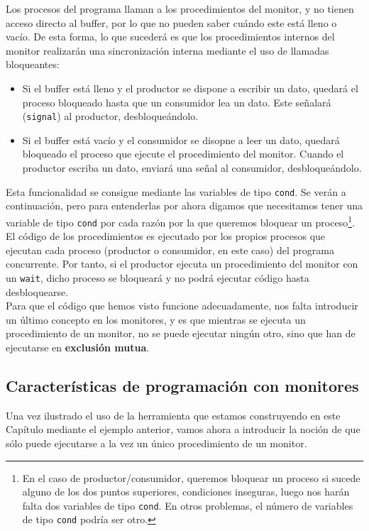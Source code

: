 \begin{ejemplo}
\begin{itemize}
    \end{itemize}
    Los procesos del programa llaman a los procedimientos del monitor, y no tienen acceso directo al buffer, por lo que no pueden saber cuándo este está lleno o vacío. De esta forma, lo que sucederá es que los procedimientos internos del monitor realizarán una sincronización interna mediante el uso de llamadas bloqueantes:
    \begin{itemize}
        \item Si el buffer está lleno y el productor se dispone a escribir un dato, quedará el proceso bloqueado hasta que un consumidor lea un dato. Este señalará (\verb|signal|) al productor, desbloqueándolo.
        \item Si el buffer está vacío y el consumidor se disopne a leer un dato, quedará bloqueado el proceso que ejecute el procedimiento del monitor. Cuando el productor escriba un dato, enviará una señal al consumidor, desbloqueándolo.
    \end{itemize}
    Esta funcionalidad se consigue mediante las variables de tipo \verb|cond|. Se verán a continuación, pero para entenderlas por ahora digamos que necesitamos tener una variable de tipo \verb|cond| por cada razón por la que queremos bloquear un proceso\footnote{En el caso de productor/consumidor, queremos bloquear un proceso si sucede alguno de los dos puntos superiores, condiciones inseguras, luego nos harán falta dos variables de tipo \texttt{cond}. En otros problemas, el número de variables de tipo \texttt{cond} podría ser otro.}.\\

    El código de los procedimientos es ejecutado por los propios procesos que ejecutan cada proceso (productor o consumidor, en este caso) del programa concurrente. Por tanto, si el productor ejecuta un procedimiento del monitor con un \verb|wait|, dicho proceso se bloqueará y no podrá ejecutar código hasta desbloquearse.\\

    Para que el código que hemos visto funcione adecuadamente, nos falta introducir un último concepto en los monitores, y es que mientras se ejecuta un procedimiento de un monitor, no se puede ejecutar ningún otro, sino que han de ejecutarse en \textbf{exclusión mutua}.
\end{ejemplo}

\subsection{Características de programación con monitores}
Una vez ilustrado el uso de la herramienta que estamos construyendo en este Capítulo mediante el ejemplo anterior, vamos ahora a introducir la noción de que sólo puede ejecutarse a la vez un único procedimiento de un monitor.\\

